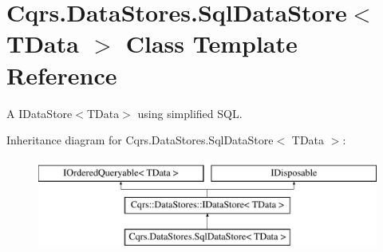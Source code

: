 \hypertarget{classCqrs_1_1DataStores_1_1SqlDataStore}{}\section{Cqrs.\+Data\+Stores.\+Sql\+Data\+Store$<$ T\+Data $>$ Class Template Reference}
\label{classCqrs_1_1DataStores_1_1SqlDataStore}


A I\+Data\+Store$<$\+T\+Data$>$ using simplified S\+QL.  


Inheritance diagram for Cqrs.\+Data\+Stores.\+Sql\+Data\+Store$<$ T\+Data $>$\+:\begin{figure}[H]
\begin{center}
\leavevmode
\includegraphics[height=3.000000cm]{classCqrs_1_1DataStores_1_1SqlDataStore}
\end{center}
\end{figure}
